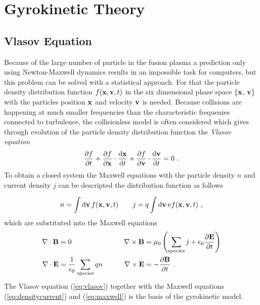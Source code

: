 \newpage
\section{Gyrokinetic Theory}
\label{sec:gyrokinetic}

\subsection{Vlasov Equation}
\label{sub:vlasov}

Because of the large number of particle in the fusion plasma a prediction only using Newton-Maxwell dynamics results in an impossible task for computers, but this problem can be solved with a statistical approach. For that the particle density distribution function $f(\boldsymbol{\mathbf{x}}, \boldsymbol{\mathbf{v}}, t)$ in the six dimensional phase space $\{\boldsymbol{\mathbf{x}}$, $\boldsymbol{\mathbf{v}}\}$ with the particles position $\boldsymbol{\mathbf{x}}$ and velocity $\boldsymbol{\mathbf{v}}$ is needed. Because collisions are happening at much smaller frequencies than the characteristic frequenies connected to turbulence, the collisionless model is often considered \cite{Garbet2010} which gives through evolution of the particle density distribution function the \textit{Vlasov equation}
\begin{gather}
	\frac{\partial f}{\partial t} + \frac{\partial f}{\partial \boldsymbol{\mathbf{x}}} \cdot \frac{\mathrm{d}\boldsymbol{\mathbf{x}}}{\mathrm{d}t} + \frac{\partial f}{\partial \boldsymbol{\mathbf{v}}} \cdot \frac{\mathrm{d}\boldsymbol{\mathbf{v}}}{\mathrm{d}t} = 0~.
	\label{eq:vlasov}
\end{gather}
To obtain a closed system the Maxwell equations with the particle density $n$ and current density $j$ can be descripted the distribution function as follows

\begin{gather}
	n = \int \mathrm{d}\boldsymbol{\mathbf{v}}\,f(\boldsymbol{\mathbf{x}}, \boldsymbol{\mathbf{v}}, t) \qquad j = q \int \mathrm{d}\boldsymbol{\mathbf{v}}\, v f(\boldsymbol{\mathbf{x}}, \boldsymbol{\mathbf{v}}, t)~,
	\label{eq:densitycurrent}
\end{gather}
which are substituted into the Maxwell equations
\begin{gather}
	\begin{aligned}
		\nabla \cdot \boldsymbol{\mathbf{B}} &= 0 &\qquad \nabla \times \boldsymbol{\mathbf{B}} &= \mu_0\left( \sum_\mathrm{species} j + \epsilon_0 \frac{\partial \boldsymbol{\mathbf{E}}}{\partial t} \right) \\
		\nabla \cdot \boldsymbol{\mathbf{E}} &= \frac{1}{\epsilon_0} \sum_\mathrm{species} qn &\qquad \nabla \times \boldsymbol{\mathbf{E}} &= - \frac{\partial \boldsymbol{\mathbf{B}}}{\partial t}~.
	\end{aligned}
	\label{eq:maxwell}
\end{gather}
The Vlasov equation (\ref{eq:vlasov}) together with the Maxwell equations (\ref{eq:densitycurrent}) and (\ref{eq:maxwell}) is the basis of the gyrokinetic model. \cite{Krommes2012}

